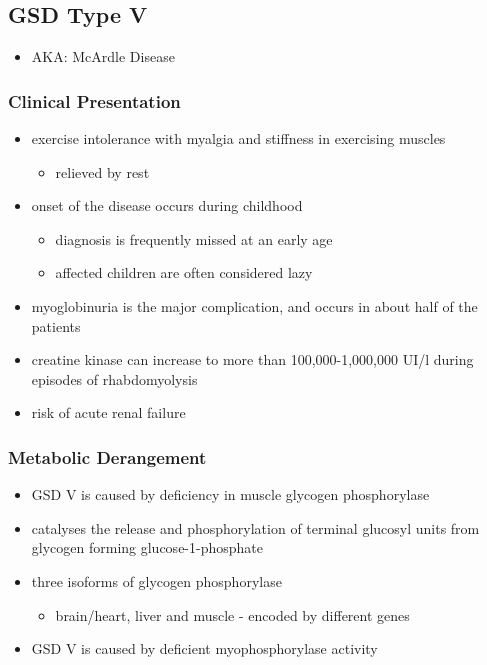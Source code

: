 \documentclass{scrartcl}
\begin{document}
\subsection{GSD Type V}
\label{sec:org02ea5c6}
\begin{itemize}
\item AKA: McArdle Disease
\end{itemize}
\subsubsection{Clinical Presentation}
\label{sec:org771efc8}
\begin{itemize}
\item exercise intolerance with myalgia and stiffness in exercising muscles
\begin{itemize}
\item relieved by rest
\end{itemize}
\item onset of the disease occurs during childhood
\begin{itemize}
\item diagnosis is frequently missed at an early age
\item affected children are often considered lazy
\end{itemize}
\item myoglobinuria is the major complication, and occurs in about half of
the patients
\item creatine kinase can increase to more than 100,000-1,000,000
UI/l during episodes of rhabdomyolysis
\item risk of acute renal failure
\end{itemize}
\subsubsection{Metabolic Derangement}
\label{sec:org9754ed3}
\begin{itemize}
\item GSD V is caused by deficiency in muscle glycogen phosphorylase
\item catalyses the release and phosphorylation of terminal glucosyl units
from glycogen forming glucose-1-phosphate
\item three isoforms of glycogen phosphorylase
\begin{itemize}
\item brain/heart, liver and muscle - encoded by different genes
\end{itemize}
\item GSD V is caused by deficient myophosphorylase activity
\end{itemize}
\end{document}
